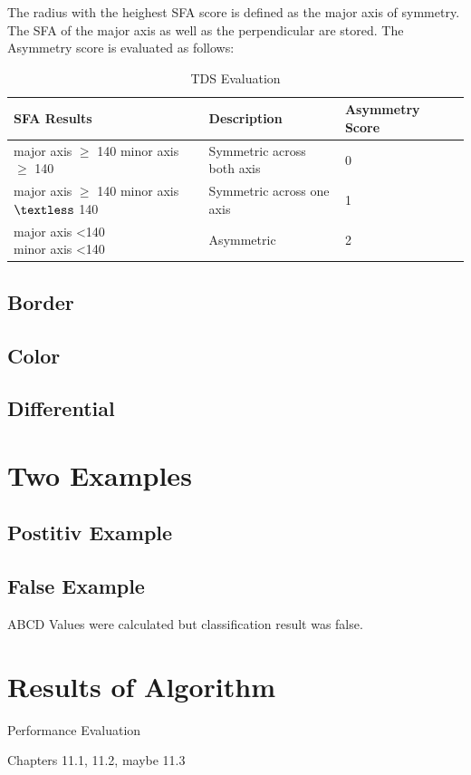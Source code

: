  The radius with the heighest SFA score is defined as the major axis of symmetry. The SFA of the major axis as well as the perpendicular are stored. The Asymmetry score is evaluated as follows:


\begin{table}[H]
\centering
\small
    \begin{tabular}{ | l | p{3.5cm} | l | p{3.5cm} |}
    \hline
    SFA Results & Description & Asymmetry Score \\ \hline
    \specialcell[t]{major axis $\geq$ 140 \\ minor axis $\geq$ 140} & Symmetric across both axis & 0  \\ \hline
    \specialcell[t]{major axis $\geq$ 140 \\ minor axis $\textless$ 140} & Symmetric across one axis & 1  \\ \hline
    \specialcell[t]{major axis \textless 140 \\ minor axis \textless 140} & Asymmetric & 2  \\ \hline


    \end{tabular}

    \caption{TDS Evaluation\cite{Weigert_2012}}
    \label{fig:tds_eval}

\end{table}


\subsection{Border}

\subsection{Color}

\subsection{Differential}

\section{Two Examples}
\subsection{Postitiv Example}

\subsection{False Example}

ABCD Values were calculated but classification result was false.

\section{Results of Algorithm}

Performance Evaluation

Chapters 11.1, 11.2, maybe 11.3